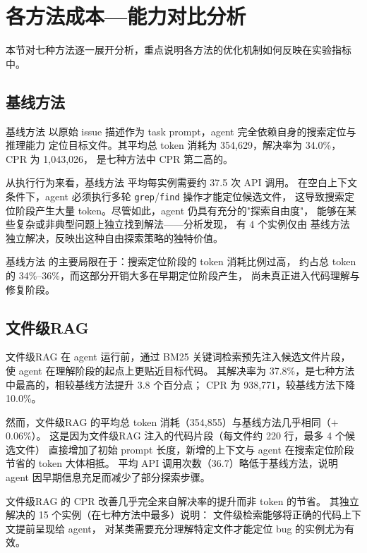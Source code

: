 \section{各方法成本—能力对比分析}
\label{sec:method-comparison}

本节对七种方法逐一展开分析，重点说明各方法的优化机制如何反映在实验指标中。

\subsection{基线方法}
\label{subsec:analysis-baseline}

基线方法 以原始 issue 描述作为 task prompt，agent 完全依赖自身的搜索定位与推理能力
定位目标文件。其平均总 token 消耗为 354,629，解决率为 34.0\%，CPR 为 1,043,026，
是七种方法中 CPR 第二高的。

从执行行为来看，基线方法 平均每实例需要约 37.5 次 API 调用。
在空白上下文条件下，agent 必须执行多轮 \texttt{grep}/\texttt{find} 操作才能定位候选文件，
这导致搜索定位阶段产生大量 token。尽管如此，agent 仍具有充分的"探索自由度"，
能够在某些复杂或非典型问题上独立找到解法——分析发现，
有 4 个实例仅由 基线方法 独立解决，反映出这种自由探索策略的独特价值。

基线方法 的主要局限在于：搜索定位阶段的 token 消耗比例过高，
约占总 token 的 34\%–36\%，而这部分开销大多在早期定位阶段产生，
尚未真正进入代码理解与修复阶段。

\subsection{文件级RAG}
\label{subsec:analysis-rag-topk}

文件级RAG 在 agent 运行前，通过 BM25 关键词检索预先注入候选文件片段，
使 agent 在理解阶段的起点上更贴近目标代码。
其解决率为 37.8\%，是七种方法中最高的，相较基线方法提升 3.8 个百分点；
CPR 为 938,771，较基线方法下降 10.0\%。

然而，文件级RAG 的平均总 token 消耗（354,855）与基线方法几乎相同（$+$0.06\%）。
这是因为文件级RAG 注入的代码片段（每文件约 220 行，最多 4 个候选文件）
直接增加了初始 prompt 长度，新增的上下文与 agent 在搜索定位阶段节省的 token 大体相抵。
平均 API 调用次数（36.7）略低于基线方法，说明 agent 因早期信息充足而减少了部分探索步骤。

文件级RAG 的 CPR 改善几乎完全来自解决率的提升而非 token 的节省。
其独立解决的 15 个实例（在七种方法中最多）说明：
文件级检索能够将正确的代码上下文提前呈现给 agent，
对某类需要充分理解特定文件才能定位 bug 的实例尤为有效。

